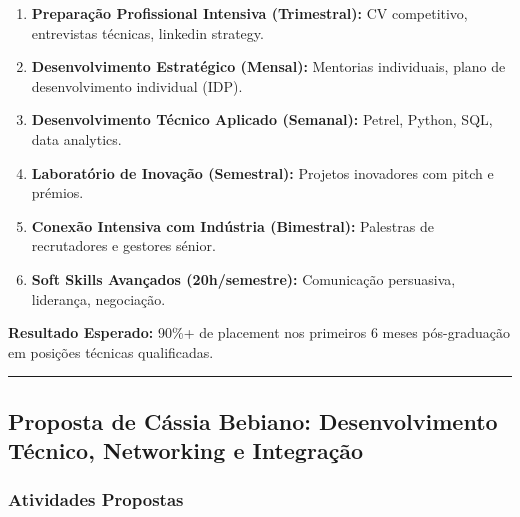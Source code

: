\documentclass[12pt,a4paper]{article}
\newcommand{\proposalsep}{%
  \vspace{6pt}%
  {\color{gold}\rule{0.35\linewidth}{0.7pt}}%
  \vspace{4pt}%
}
\begin{document}
\begin{enumerate}
    \item \textbf{Preparação Profissional Intensiva (Trimestral):} CV competitivo, entrevistas técnicas, linkedin strategy.
    \item \textbf{Desenvolvimento Estratégico (Mensal):} Mentorias individuais, plano de desenvolvimento individual (IDP).
    \item \textbf{Desenvolvimento Técnico Aplicado (Semanal):} Petrel, Python, SQL, data analytics.
    \item \textbf{Laboratório de Inovação (Semestral):} Projetos inovadores com pitch e prémios.
    \item \textbf{Conexão Intensiva com Indústria (Bimestral):} Palestras de recrutadores e gestores sénior.
    \item \textbf{Soft Skills Avançados (20h/semestre):} Comunicação persuasiva, liderança, negociação.
\end{enumerate}

\begin{infobox}
\small\textbf{Resultado Esperado:} 90\%+ de placement nos primeiros 6 meses pós-graduação em posições técnicas qualificadas.
\end{infobox}

\proposalsep

\subsection{Proposta de Cássia Bebiano: Desenvolvimento Técnico, Networking e Integração}

\subsubsection*{Atividades Propostas}
\end{document}
